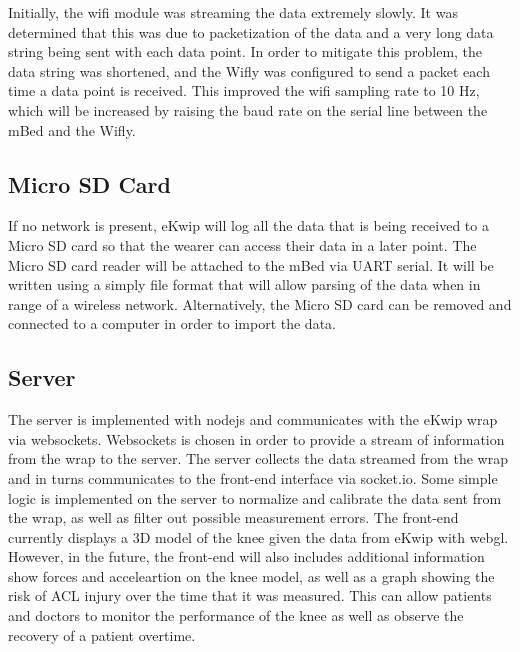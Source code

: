 Initially, the wifi module was streaming the data extremely slowly. It was determined that this was due to packetization of the data and a very long data string being sent with each data point. In order to mitigate this problem, the data string was shortened, and the Wifly was configured to send a packet each time a data point is received. This improved the wifi sampling rate to 10 Hz, which will be increased by raising the baud rate on the serial line between the mBed and the Wifly.

\subsection {Micro SD Card}
If no network is present, eKwip will log all the data that is being received to a Micro SD card so that the wearer can access their data in a later point. The Micro SD card reader will be attached to the mBed via UART serial. It will be written using a simply file format that will allow parsing of the data when in range of a wireless network. Alternatively, the Micro SD card can be removed and connected to a computer in order to import the data.

\subsection {Server}
The server is implemented with nodejs and communicates with the eKwip wrap via websockets. Websockets is chosen in order to provide a stream of information from the wrap to the server. The server collects the data streamed from the wrap and in turns communicates to the front-end interface via socket.io. Some simple logic is implemented on the server to normalize and calibrate the data sent from the wrap, as well as filter out possible measurement errors. The front-end currently displays a 3D model of the knee given the data from eKwip with webgl. However, in the future, the front-end will also includes additional information show forces and acceleartion on the knee model, as well as a graph showing the risk of ACL injury over the time that it was measured. This can allow patients and doctors to monitor the performance of the knee as well as observe the recovery of a patient overtime.
